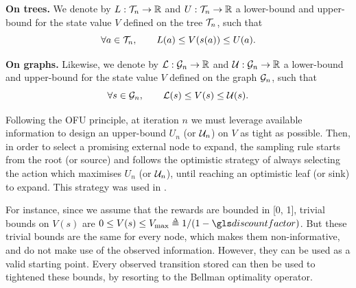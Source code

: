 \begin{definition}
	\begin{leftbar}[defnbar]
	{\textbf{On trees.}} We denote by $L:\mathcal{T}_n \rightarrow \mathbb{R}$ and  $U:\mathcal{T}_n \rightarrow \mathbb{R}$ a lower-bound and upper-bound for the state value $V$ defined on the tree $\mathcal{T}_n$, such that
	\begin{equation*}
	\forall a\in\mathcal{T}_n, \qquad L(a) \leq V(s(a)) \leq U(a).
	\end{equation*}
	
	{\textbf{On graphs.}} Likewise, we denote by $\mathcal{L}:\mathcal{G}_n \rightarrow \mathbb{R}$ and  $\mathcal{U}:\mathcal{G}_n \rightarrow \mathbb{R}$ a lower-bound and upper-bound for the state value $V$ defined on the graph $\mathcal{G}_n$, such that
	\begin{equation*}
	\forall s\in\mathcal{G}_n, \qquad \mathcal{L}(s) \leq V(s) \leq \mathcal{U}(s).
	\end{equation*}
	\end{leftbar}
\end{definition}

Following the OFU principle, at iteration $n$ we must leverage available information to design an upper-bound $U_n$ (or $\mathcal{U}_n$) on $V$ as tight as possible. Then, in order to select a promising external node to expand, the sampling rule starts from the root (or source) and follows the optimistic strategy of always selecting the action which maximises $U_n$ (or $\mathcal{U}_n$), until reaching an optimistic leaf (or sink) to expand. This strategy was used in \citep[e.g.][]{Kocsis06UCT, Hren2008optimistic, Bubeck2010open, Busoniu2012optimistic}.

For instance, since we assume that the rewards are bounded in [0, 1], trivial bounds on $V(s)$ are
$0 \leq V(s) \leq V_{\max} \eqdef {1}/({1-\discount})$. But these trivial bounds are the same for every node, which makes them non-informative, and do not make use of the observed information. However, they can be used as a valid starting point. Every observed transition stored can then be used to tightened these bounds, by resorting to the Bellman optimality operator.

